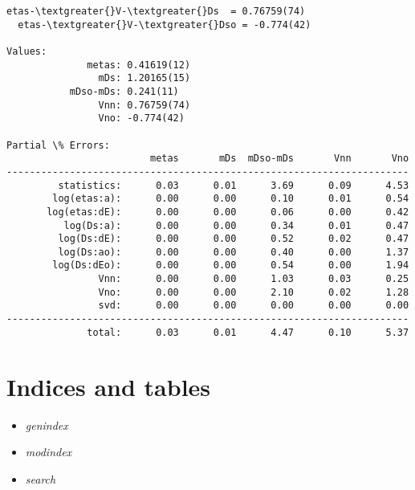 \documentclass[letterpaper,10pt,english]{sphinxmanual}
\begin{document}
\begin{itemize}
\begin{Verbatim}[commandchars=\\\{\}]
  etas-\textgreater{}V-\textgreater{}Ds  = 0.76759(74)
  etas-\textgreater{}V-\textgreater{}Dso = -0.774(42)

Values:
              metas: 0.41619(12)         
                mDs: 1.20165(15)         
           mDso-mDs: 0.241(11)           
                Vnn: 0.76759(74)         
                Vno: -0.774(42)          

Partial \% Errors:
                         metas       mDs  mDso-mDs       Vnn       Vno
----------------------------------------------------------------------
         statistics:      0.03      0.01      3.69      0.09      4.53
        log(etas:a):      0.00      0.00      0.10      0.01      0.54
       log(etas:dE):      0.00      0.00      0.06      0.00      0.42
          log(Ds:a):      0.00      0.00      0.34      0.01      0.47
         log(Ds:dE):      0.00      0.00      0.52      0.02      0.47
         log(Ds:ao):      0.00      0.00      0.40      0.00      1.37
        log(Ds:dEo):      0.00      0.00      0.54      0.00      1.94
                Vnn:      0.00      0.00      1.03      0.03      0.25
                Vno:      0.00      0.00      2.10      0.02      1.28
                svd:      0.00      0.00      0.00      0.00      0.00
----------------------------------------------------------------------
              total:      0.03      0.01      4.47      0.10      5.37
\end{Verbatim}

\end{itemize}


\chapter{Indices and tables}
\label{index:indices-and-tables}\begin{itemize}
\item {} 
\emph{genindex}

\item {} 
\emph{modindex}

\item {} 
\emph{search}

\end{itemize}



\renewcommand{\indexname}{Index}
\printindex
\end{document}
